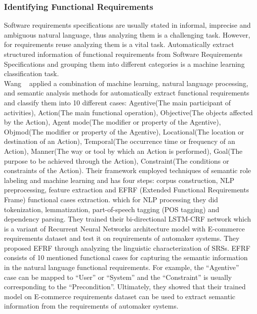 \subsubsection{Identifying Functional Requirements}

Software requirements specifications are usually stated in informal, imprecise
and ambiguous natural language, thus analyzing them is a challenging task.
However, for requirements reuse analyzing them is a vital task. Automatically
extract structured information of functional requirements from Software
Requirements Specifications and grouping them into different categories is a
machine learning classification task\cite{7949577}. \\

Wang \etal~\cite{7949577} applied a combination of machine learning, natural
language processing, and semantic analysis methods for automatically extract
functional requirements and classify them into 10 different cases: Agentive(The
main participant of activities), Action(The main functional operation),
Objective(The objects affected by the Action), Agent mode(The modifier or
property of the Agentive), Objmod(The modifier or property of the Agentive),
Locational(The location or destination of an Action), Temporal(The occurrence
time or frequency of an Action), Manner(The way or tool by which an Action is
performed), Goal(The purpose to be achieved through the Action), Constraint(The
conditions or constraints of the Action). Their framework employed techniques of
semantic role labeling and machine learning and has four steps: corpus
construction, NLP preprocessing, feature extraction and  EFRF (Extended
Functional Requirements Frame) functional cases extraction. which for NLP
processing they did tokenization, lemmatization, part-of-speech tagging (POS 
tagging) and dependency parsing. They trained their bi-directional LSTM-CRF
network which is a variant of Recurrent Neural Networks architecture model with
E-commerce requirements dataset and test it on requirements of automaker
systems. They proposed EFRF through analyzing the linguistic characterization of
SRSs. EFRF consists of 10 mentioned functional cases for capturing the semantic
information in the natural language functional requirements. For example, the
“Agentive” case can be mapped to “User” or “System” and the “Constraint” is
usually corresponding to the “Precondition”. Ultimately, they showed that their
trained model on E-commerce requirements dataset can be used to extract semantic
information from the requirements of automaker systems.

